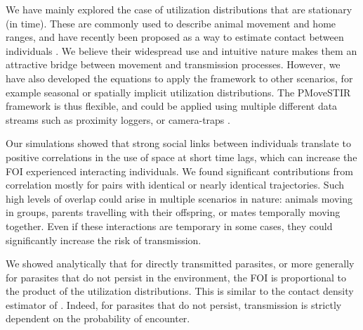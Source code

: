 \documentclass[letterpaper]{article}
\begin{document}
We have mainly explored the case of utilization distributions that are stationary (in time). These are commonly used to describe animal movement and home ranges, and have recently been proposed as a way to estimate contact between individuals \citep{Noonan2021}. 
We believe their widespread use and intuitive nature makes them an attractive bridge between movement and transmission processes. 
However, we have also developed the equations to apply the framework to other scenarios, for example seasonal or spatially implicit utilization distributions. 
The PMoveSTIR framework is thus flexible, and could be applied using multiple different data streams such as proximity loggers, or camera-traps \citep{Wilber2022}.

Our simulations showed that strong social links between individuals translate to positive correlations  in the use of space at short time lags, which can increase the FOI experienced interacting individuals. 
We found significant contributions from correlation mostly for pairs with identical or nearly identical trajectories. Such high levels of overlap could arise in multiple scenarios in nature: animals moving in groups, parents travelling with their offspring, or mates temporally moving together. Even if these interactions are temporary in some cases, they could significantly increase the risk of transmission. 

We showed analytically that for directly transmitted parasites, or more generally for parasites that do not persist in the environment, the FOI is proportional to the product of the utilization distributions. This is similar to the contact density estimator of \citet{Noonan2021}. Indeed, for parasites that do not persist, transmission is strictly dependent on the probability of encounter.
\end{document}
